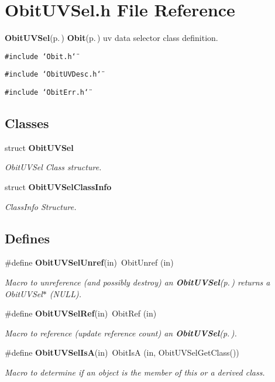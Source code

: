\section{Obit\-UVSel.h File Reference}
\label{ObitUVSel_8h}
{\bf Obit\-UVSel}{\rm (p.\,\pageref{structObitUVSel})} {\bf Obit}{\rm (p.\,\pageref{structObit})} uv data selector class definition. 

{\tt \#include \char`\"{}Obit.h\char`\"{}}\par
{\tt \#include \char`\"{}Obit\-UVDesc.h\char`\"{}}\par
{\tt \#include \char`\"{}Obit\-Err.h\char`\"{}}\par
\subsection*{Classes}
\begin{CompactItemize}
\item 
struct {\bf Obit\-UVSel}
\begin{CompactList}\small\item\em Obit\-UVSel Class structure. \item\end{CompactList}\item 
struct {\bf Obit\-UVSel\-Class\-Info}
\begin{CompactList}\small\item\em Class\-Info Structure. \item\end{CompactList}\end{CompactItemize}
\subsection*{Defines}
\begin{CompactItemize}
\item 
\#define {\bf Obit\-UVSel\-Unref}(in)\ Obit\-Unref (in)
\begin{CompactList}\small\item\em Macro to unreference (and possibly destroy) an {\bf Obit\-UVSel}{\rm (p.\,\pageref{structObitUVSel})} returns a Obit\-UVSel$\ast$ (NULL). \item\end{CompactList}\item 
\#define {\bf Obit\-UVSel\-Ref}(in)\ Obit\-Ref (in)
\begin{CompactList}\small\item\em Macro to reference (update reference count) an {\bf Obit\-UVSel}{\rm (p.\,\pageref{structObitUVSel})}. \item\end{CompactList}\item 
\#define {\bf Obit\-UVSel\-Is\-A}(in)\ Obit\-Is\-A (in, Obit\-UVSel\-Get\-Class())
\begin{CompactList}\small\item\em Macro to determine if an object is the member of this or a derived class. \item\end{CompactList}\end{CompactItemize}
